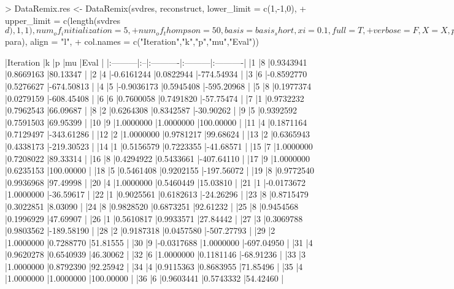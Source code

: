 \documentclass{article}
\begin{document}
\begin{Schunk}
\begin{Sinput}
> DataRemix.res <- DataRemix(svdres, reconstruct, lower_limit = c(1,-1,0), 
+                  upper_limit = c(length(svdres$d), 1,1), num_of_initialization = 5,
+                  num_of_thompson = 50, basis = basis_short, xi = 0.1, full = T, 
+                  verbose = F, X = X, penalty = 100)
> knitr::kable(cbind(1:55,DataRemix.res$para), align = "l", 
+              col.names = c("Iteration","k","p","mu","Eval"))
\end{Sinput}
\begin{Soutput}
|Iteration |k  |p          |mu        |Eval       |
|:---------|:--|:----------|:---------|:----------|
|1         |8  |0.9343941  |0.8669163 |80.13347   |
|2         |4  |-0.6161244 |0.0822944 |-774.54934 |
|3         |6  |-0.8592770 |0.5276627 |-674.50813 |
|4         |5  |-0.9036173 |0.5945408 |-595.20968 |
|5         |8  |0.1977374  |0.0279159 |-608.45408 |
|6         |6  |0.7600058  |0.7491820 |-57.75474  |
|7         |1  |0.9732232  |0.7962543 |66.09687   |
|8         |2  |0.6264308  |0.8342587 |-30.90262  |
|9         |5  |0.9392592  |0.7591503 |69.95399   |
|10        |9  |1.0000000  |1.0000000 |100.00000  |
|11        |4  |0.1871164  |0.7129497 |-343.61286 |
|12        |2  |1.0000000  |0.9781217 |99.68624   |
|13        |2  |0.6365943  |0.4338173 |-219.30523 |
|14        |1  |0.5156579  |0.7223355 |-41.68571  |
|15        |7  |1.0000000  |0.7208022 |89.33314   |
|16        |8  |0.4294922  |0.5433661 |-407.64110 |
|17        |9  |1.0000000  |0.6235153 |100.00000  |
|18        |5  |0.5461408  |0.9202155 |-197.56072 |
|19        |8  |0.9772540  |0.9936968 |97.49998   |
|20        |4  |1.0000000  |0.5460449 |15.03810   |
|21        |1  |-0.0173672 |1.0000000 |-36.59617  |
|22        |1  |0.9025561  |0.6182613 |-24.26296  |
|23        |8  |0.8715479  |0.3022851 |8.03090    |
|24        |8  |0.9828520  |0.6873251 |92.61232   |
|25        |8  |0.9454568  |0.1996929 |47.69907   |
|26        |1  |0.5610817  |0.9933571 |27.84442   |
|27        |3  |0.3069788  |0.9803562 |-189.58190 |
|28        |2  |0.9187318  |0.0457580 |-507.27793 |
|29        |2  |1.0000000  |0.7288770 |51.81555   |
|30        |9  |-0.0317688 |1.0000000 |-697.04950 |
|31        |4  |0.9620278  |0.6540939 |46.30062   |
|32        |6  |1.0000000  |0.1181146 |-68.91236  |
|33        |3  |1.0000000  |0.8792390 |92.25942   |
|34        |4  |0.9115363  |0.8683955 |71.85496   |
|35        |4  |1.0000000  |1.0000000 |100.00000  |
|36        |6  |0.9603441  |0.5743332 |54.42460   |

\end{Soutput}
\end{Schunk}
\end{document}
